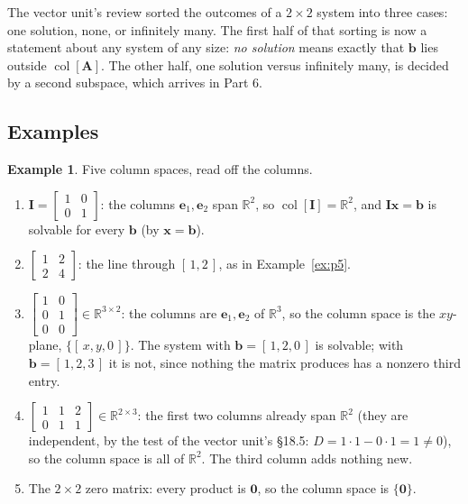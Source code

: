 \documentclass[11pt]{article}
\theoremstyle{plain}
\theoremstyle{definition}
\newtheorem{ex}{Example}[section]
\theoremstyle{remark}
\newcommand{\R}{\mathbb{R}}
\newcommand{\vc}[1]{\mathbf{#1}}        %
\newcommand{\mt}[1]{\mathbf{#1}}        %
\newcommand{\colsp}[1]{\operatorname{col}[#1]}
\begin{document}
\noindent The vector unit's review sorted the outcomes of a $2\times2$ system
into three cases: one solution, none, or infinitely many. The first half of
that sorting is now a statement about any system of any size: \emph{no
solution} means exactly that $\vc{b}$ lies outside $\colsp{\mt{A}}$. The other
half, one solution versus infinitely many, is decided by a second subspace,
which arrives in Part 6.

\subsection{Examples}
\begin{ex}
\label{ex:colspaces}
Five column spaces, read off the columns.
\begin{enumerate}[label=(\alph*),leftmargin=2em,itemsep=3pt]
  \item $\mt{I}=\begin{bmatrix}1&0\\0&1\end{bmatrix}$: the columns
        $\vc{e}_1,\vc{e}_2$ span $\R^{2}$, so $\colsp{\mt{I}}=\R^{2}$, and
        $\mt{I}\vc{x}=\vc{b}$ is solvable for every $\vc{b}$ (by
        $\vc{x}=\vc{b}$).
  \item $\begin{bmatrix}1&2\\2&4\end{bmatrix}$: the line through $[\,1,2\,]$,
        as in Example~\ref{ex:p5}.
  \item $\begin{bmatrix}1&0\\0&1\\0&0\end{bmatrix}\in\R^{3\times2}$: the
        columns are $\vc{e}_1,\vc{e}_2$ of $\R^{3}$, so the column space is
        the $xy$-plane, $\{[\,x,y,0\,]\}$. The system with $\vc{b}=[\,1,2,0\,]$
        is solvable; with $\vc{b}=[\,1,2,3\,]$ it is not, since nothing the
        matrix produces has a nonzero third entry.
  \item $\begin{bmatrix}1&1&2\\0&1&1\end{bmatrix}\in\R^{2\times3}$: the first
        two columns already span $\R^{2}$ (they are independent, by the test
        of the vector unit's \S18.5: $D=1\cdot1-0\cdot1=1\neq0$), so the column
        space is all of $\R^{2}$. The third column adds nothing new.
  \item The $2\times2$ zero matrix: every product is $\vc{0}$, so the column
        space is $\{\vc{0}\}$.
\end{enumerate}
\end{ex}
\end{document}
